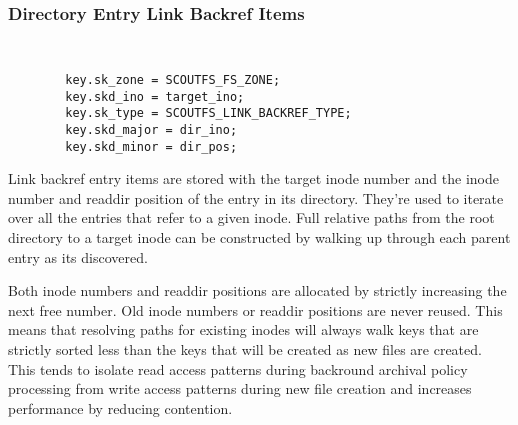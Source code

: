 \documentclass[letterpaper,twocolumn,10pt]{article}
\begin{document}
\subsubsection{Directory Entry Link Backref Items}

{\tt \small
\begin{verbatim}
        key.sk_zone = SCOUTFS_FS_ZONE;
        key.skd_ino = target_ino;
        key.sk_type = SCOUTFS_LINK_BACKREF_TYPE;
        key.skd_major = dir_ino;
        key.skd_minor = dir_pos;
\end{verbatim}
}

Link backref entry items are stored with the target inode number and the
inode number and readdir position of the entry in its directory.
They're used to iterate over all the entries that refer to a given
inode.  Full relative paths from the root directory to a target inode
can be constructed by walking up through each parent entry as its
discovered.

Both inode numbers and readdir positions are allocated by strictly
increasing the next free number.  Old inode numbers or readdir positions
are never reused.  This means that resolving paths for existing inodes
will always walk keys that are strictly sorted less than the keys that
will be created as new files are created.  This tends to isolate read
access patterns during backround archival policy processing from write
access patterns during new file creation and increases performance by
reducing contention.
\end{document}
